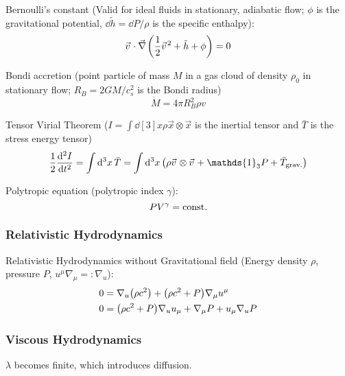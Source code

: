 			\noindent
			Bernoulli's constant (Valid for ideal fluids in stationary, adiabatic flow; $\phi$ is the gravitational potential, $\dd \tilde{h} = \dd P / \rho$ is the specific enthalpy):
			\begin{equation}
				\vec{v}\cdot \Nabla \qty(\frac{1}{2}\vec{v}^2 + \tilde{h} + \phi) = 0
			\end{equation}

			\noindent
			Bondi accretion (point particle of mass $M$ in a gas cloud of density $\rho_0$ in stationary flow; $R_B = 2 G M/c_s^2$ is the Bondi radius)
			\begin{equation}
				\dot{M} = 4 \pi R_B^2 \rho v
			\end{equation}

			\noindent
			Tensor Virial Theorem ($I = 	\int \dd[3]{x} \rho \vec{x} \otimes \vec{x}$ is the inertial tensor and $\bar{T}$ is the stress energy tensor)
			\begin{equation}
				\frac{1}{2}\dv[2]{I}{t}
				= \int \dd[3]{x} \bar{T}
				= \int \dd[3]{x} \qty(\rho \vec{v}\otimes\vec{v} + \mathds{1}_3 P + \bar{T}_{\text{grav.}})
			\end{equation}

			\noindent
			Polytropic equation (polytropic index $\gamma$):
			\begin{equation}
				\label{eq:PolytropicEquation}
				P V^\gamma = \mathrm{const.}
			\end{equation}


		\subsubsection{Relativistic Hydrodynamics}
			Relativistic Hydrodynamics without Gravitational field (Energy density $\rho$, pressure $P$, $u^\mu \nabla_\mu =: \nabla_u$):
			\begin{equation}
				\begin{aligned}
					0 &= \nabla_u \qty(\rho c^2) + \qty(\rho c^2 + P) \nabla_\mu u^\mu \\
					0 &= \qty(\rho c^2 + P) \nabla_u u_\mu + \nabla_\mu P + u_\mu \nabla_u P \\
				\end{aligned}
			\end{equation}

		\subsubsection{Viscous Hydrodynamics}
			$\lambda$ becomes finite, which introduces diffusion.

